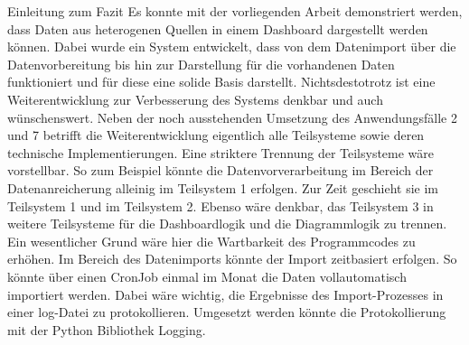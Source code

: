 


Einleitung zum Fazit
Es konnte mit der vorliegenden Arbeit demonstriert werden, dass Daten aus heterogenen Quellen in einem Dashboard dargestellt werden können. Dabei wurde ein System entwickelt, dass von dem Datenimport über die Datenvorbereitung bis hin zur Darstellung für die vorhandenen Daten funktioniert und für diese eine solide Basis darstellt. Nichtsdestotrotz ist eine Weiterentwicklung zur Verbesserung des Systems denkbar und auch wünschenswert. 
Neben der noch ausstehenden Umsetzung des Anwendungsfälle 2 und 7 betrifft die Weiterentwicklung eigentlich alle Teilsysteme sowie deren technische Implementierungen.
Eine striktere Trennung der Teilsysteme wäre vorstellbar. So zum Beispiel könnte die Datenvorverarbeitung im Bereich der Datenanreicherung alleinig im Teilsystem 1 erfolgen. Zur Zeit geschieht sie im Teilsystem 1 und im Teilsystem 2.  Ebenso wäre denkbar, das Teilsystem 3 in weitere Teilsysteme für die Dashboardlogik und die Diagrammlogik zu trennen. Ein wesentlicher Grund wäre hier die Wartbarkeit des Programmcodes zu erhöhen.
Im Bereich des Datenimports könnte der Import zeitbasiert erfolgen. So könnte über einen CronJob einmal im Monat die Daten vollautomatisch importiert werden. Dabei wäre wichtig, die Ergebnisse des Import-Prozesses in einer log-Datei zu protokollieren. Umgesetzt werden könnte die Protokollierung mit der Python Bibliothek Logging.  

